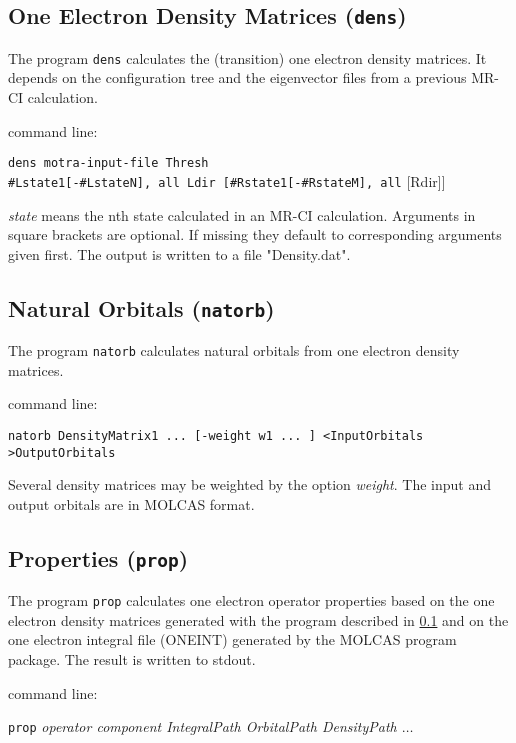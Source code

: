 \subsection{One Electron Density Matrices ({\tt dens})}
\label{Density}
The program {\tt dens} calculates the (transition) one electron density matrices.
It depends on the configuration tree and the eigenvector files from
a previous MR-CI calculation.

\bigskip
command line:

{\tt dens motra-input-file Thresh\\
{\#Lstate1[-\#LstateN], all} Ldir {[\#Rstate1[-\#RstateM], all}}  [Rdir]]


{\it state} means the nth state calculated in an MR-CI calculation.
Arguments in square brackets are optional. If missing they default to
corresponding arguments given first. The output is written
to a file "Density.dat".




\subsection{Natural Orbitals ({\tt natorb})}
\label{Natural}
The program {\tt natorb} calculates natural orbitals from one electron 
density matrices.

\bigskip
command line:

{\tt natorb DensityMatrix1 ... [-weight w1 ... ] <InputOrbitals >OutputOrbitals}

Several density matrices may be weighted by the option {\it weight}.
The input and output orbitals are in MOLCAS format.







\subsection{Properties ({\tt prop})}

The program {\tt prop} calculates one electron operator properties
based on the one electron density matrices generated with the program
described in \ref{Density} and on the one electron integral file
(ONEINT) generated by the MOLCAS program package. The result is
written to stdout.

\bigskip
command line:

{\tt prop} {\it operator component IntegralPath OrbitalPath DensityPath $\ldots$}

